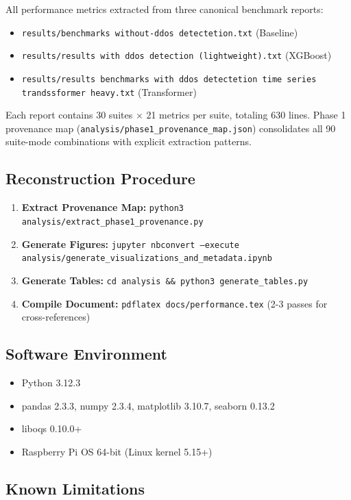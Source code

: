 \documentclass[11pt,a4paper]{article}
\begin{document}
All performance metrics extracted from three canonical benchmark reports:
\begin{itemize}
    \item \texttt{results/benchmarks without-ddos detectetion.txt} (Baseline)
    \item \texttt{results/results with ddos detection (lightweight).txt} (XGBoost)
    \item \texttt{results/results benchmarks with ddos detectetion time series trandssformer heavy.txt} (Transformer)
\end{itemize}

Each report contains 30 suites × 21 metrics per suite, totaling 630 lines. Phase 1 provenance map (\texttt{analysis/phase1\_provenance\_map.json}) consolidates all 90 suite-mode combinations with explicit extraction patterns.

\subsection{Reconstruction Procedure}

\begin{enumerate}
    \item \textbf{Extract Provenance Map:} \texttt{python3 analysis/extract\_phase1\_provenance.py}
    \item \textbf{Generate Figures:} \texttt{jupyter nbconvert --execute analysis/generate\_visualizations\_and\_metadata.ipynb}
    \item \textbf{Generate Tables:} \texttt{cd analysis \&\& python3 generate\_tables.py}
    \item \textbf{Compile Document:} \texttt{pdflatex docs/performance.tex} (2-3 passes for cross-references)
\end{enumerate}

\subsection{Software Environment}

\begin{itemize}
    \item Python 3.12.3
    \item pandas 2.3.3, numpy 2.3.4, matplotlib 3.10.7, seaborn 0.13.2
    \item liboqs 0.10.0+
    \item Raspberry Pi OS 64-bit (Linux kernel 5.15+)
\end{itemize}

\subsection{Known Limitations}
\end{document}
